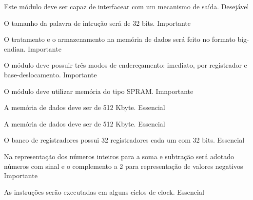\documentclass{article}
\begin{document}
	  \begin{nonfunctional}
	  	
	  {Este módulo deve ser capaz de interfacear com um mecanismo de saída.}
	  {Desejável}
	  
	  {O tamanho da palavra de intrução será de 32 bits.}
	  {Importante}
	  
        {O tratamento e o armazenamento na memória de dados será feito no formato big-endian.}
        {Importante}
        
        {O módulo deve possuir três modos de endereçamento: imediato, por registrador e base-deslocamento.}
        {Importante}
        
        {O módulo deve utilizar memória do tipo SPRAM.}
        {Imnportante}
        
        {A memória de dados deve ser de 512 Kbyte.}
        {Essencial}
        
        {A memória de dados deve ser de 512 Kbyte.}
        {Essencial}
        
        {O banco de registradores possui 32 registradores cada um com 32 bits.}
        {Essencial}
	  
		{Na representação dos números inteiros para a soma e subtração será adotado números com sinal e o complemento a 2 para representação de valores negativos}
		{Importante}
		
		{As instruções serão executadas em alguns ciclos de clock.}
		{Essencial}		
			  
	  \end{nonfunctional}
	  
	
\end{document}
